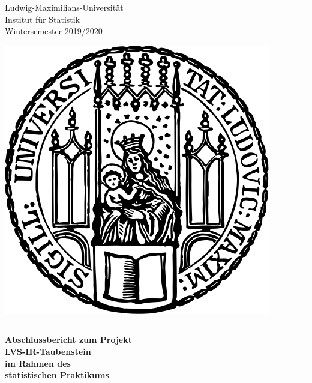 \documentclass[12pt]{scrreprt}
\begin{document}
	
\pagestyle{myheadings}	
	
\begin{titlepage}
		\begin{center}
			\begin{minipage}{0.6\textwidth}%
				\begin{flushleft}
					Ludwig-Maximilians-Universität \\
					Institut für Statistik \\
					Wintersemester 2019/2020 \\
				\end{flushleft}
			\end{minipage}
			\begin{minipage}{0.35\textwidth}%
				\begin{flushright}
					\includegraphics[scale = 0.2]{plots/lmu_logo}
				\end{flushright}
			\end{minipage}%
		\end{center}
		
		
		
		
		
		
		
		\vspace{3cm}
		
		\hrule
		
		\vspace{1cm}
		
		{\centering
			{	
				\Large\bfseries Abschlussbericht zum Projekt\\
				LVS-IR-Taubenstein \\
				im Rahmen des \\
				statistischen Praktikums\par}
			
}
\end{titlepage}
\end{document}
